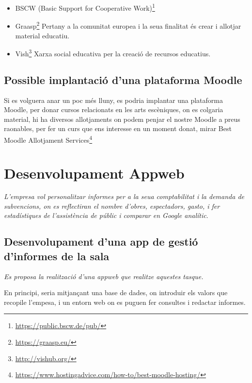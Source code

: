 \documentclass[
  10pt,
]{krantz}
\DeclareRobustCommand{\href}[2]{#2\footnote{\url{#1}}}
\providecommand{\tightlist}{%
  \setlength{\itemsep}{0pt}\setlength{\parskip}{0pt}}
\begin{document}
\begin{itemize}
\tightlist
\item
  \href{https://public.bscw.de/pub/}{BSCW (Basic Support for Cooperative Work)}
\item
  \href{https://graasp.eu/}{Graasp} Pertany a la comunitat europea i la seua finalitat és crear i allotjar material educatiu.
\item
  \href{http://vishub.org/}{Vish} Xarxa social educativa per la creació de recursos educatius.
\end{itemize}

\hypertarget{possible-implantaciuxf3-duna-plataforma-moodle}{%
\section{Possible implantació d'una plataforma Moodle}\label{possible-implantaciuxf3-duna-plataforma-moodle}}

Si es volguera anar un poc més lluny, es podria implantar una plataforma Moodle, per donar cursos relacionats en les arts escèniques, on es colgaria material, hi ha diversos allotjaments on podem penjar el nostre Moodle a preus raonables, per fer un curs que ens interesse en un moment donat, mirar \href{https://www.hostingadvice.com/how-to/best-moodle-hosting/}{Best Moodle Allotjament Services}

\hypertarget{desenvolupament-appweb}{%
\chapter{Desenvolupament Appweb}\label{desenvolupament-appweb}}

\emph{L'empresa vol personalitzar informes per a la seua comptabilitat i la demanda de subvencions, on es reflectiran el nombre d'obres, espectadors, gasto, i fer estadístiques de l'assistència de públic i comparar en Google analític}.

\hypertarget{desenvolupament-duna-app-de-gestiuxf3-dinformes-de-la-sala}{%
\section{Desenvolupament d'una app de gestió d'informes de la sala}\label{desenvolupament-duna-app-de-gestiuxf3-dinformes-de-la-sala}}

\emph{Es proposa la realització d'una appweb que realitze aquestes tasque.}

En principi, seria mitjançant una base de dades, on introduir els valors que recopile l'empesa, i un entorn web on es puguen fer consultes i redactar informes.
\end{document}
